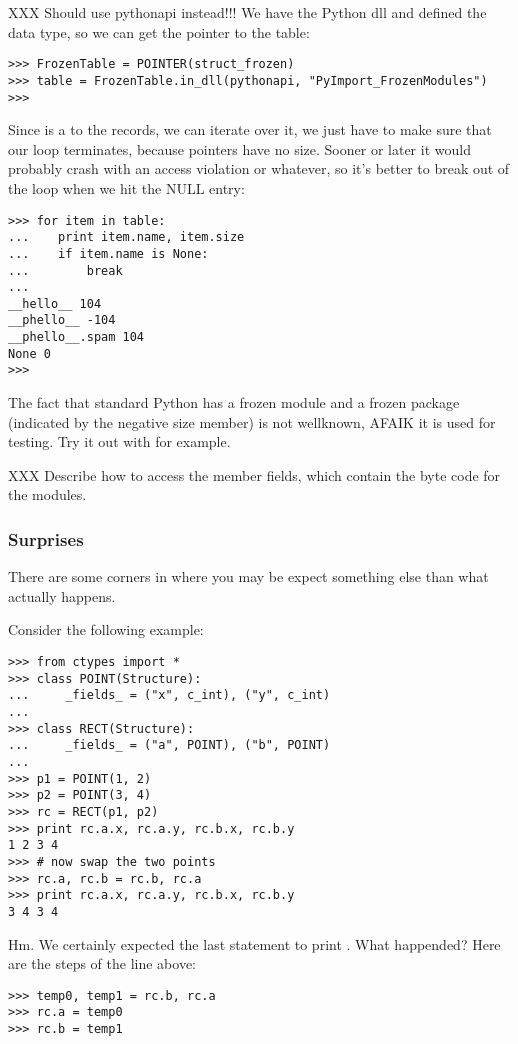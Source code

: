 XXX Should use pythonapi instead!!!
We have  the Python dll and defined the 
data type, so we can get the pointer to the table:
\begin{verbatim}
>>> FrozenTable = POINTER(struct_frozen)
>>> table = FrozenTable.in_dll(pythonapi, "PyImport_FrozenModules")
>>>
\end{verbatim}

Since  is a  to the  records, we
can iterate over it, we just have to make sure that our loop
terminates, because pointers have no size. Sooner or later it would
probably crash with an access violation or whatever, so it's better to
break out of the loop when we hit the NULL entry:
\begin{verbatim}
>>> for item in table:
...    print item.name, item.size
...    if item.name is None:
...        break
...
__hello__ 104
__phello__ -104
__phello__.spam 104
None 0
>>>
\end{verbatim}

The fact that standard Python has a frozen module and a frozen package
(indicated by the negative size member) is not wellknown, AFAIK it is
used for testing. Try it out with  for example.

XXX Describe how to access the  member fields, which contain
the byte code for the modules.


\subsubsection{Surprises\label{ctypes-surprises}}

There are some corners in  where you may be expect something
else than what actually happens.

Consider the following example:
\begin{verbatim}
>>> from ctypes import *
>>> class POINT(Structure):
...     _fields_ = ("x", c_int), ("y", c_int)
...
>>> class RECT(Structure):
...     _fields_ = ("a", POINT), ("b", POINT)
...
>>> p1 = POINT(1, 2)
>>> p2 = POINT(3, 4)
>>> rc = RECT(p1, p2)
>>> print rc.a.x, rc.a.y, rc.b.x, rc.b.y
1 2 3 4
>>> # now swap the two points
>>> rc.a, rc.b = rc.b, rc.a
>>> print rc.a.x, rc.a.y, rc.b.x, rc.b.y
3 4 3 4
\end{verbatim}

Hm. We certainly expected the last statement to print .
What happended? Here are the steps of the 
line above:
\begin{verbatim}
>>> temp0, temp1 = rc.b, rc.a
>>> rc.a = temp0
>>> rc.b = temp1
\end{verbatim}

